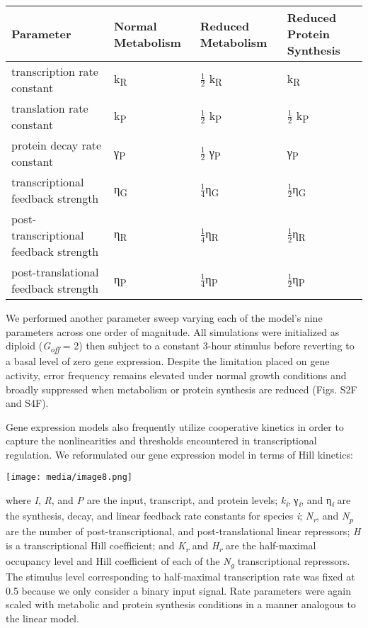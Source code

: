 \begin{longtable}[]{@{}llll@{}}
\toprule
\textbf{Parameter} & \textbf{Normal Metabolism} & \textbf{Reduced Metabolism} & \textbf{Reduced Protein Synthesis}\tabularnewline
\midrule
\endhead
transcription rate constant & k\textsubscript{R} & \(\frac{1}{2}\) k\textsubscript{R} & k\textsubscript{R}\tabularnewline
translation rate constant & k\textsubscript{P} & \(\frac{1}{2}\) k\textsubscript{P} & \(\frac{1}{2}\) k\textsubscript{P}\tabularnewline
protein decay rate constant & γ\textsubscript{P} & \(\frac{1}{2}\) γ\textsubscript{P} & γ\textsubscript{P}\tabularnewline
transcriptional feedback strength & η\textsubscript{G} & \(\frac{1}{4}\)η\textsubscript{G} & \(\frac{1}{2}\)η\textsubscript{G}\tabularnewline
post-transcriptional feedback strength & η\textsubscript{R} & \(\frac{1}{4}\)η\textsubscript{R} & \(\frac{1}{2}\)η\textsubscript{R}\tabularnewline
post-translational feedback strength & η\textsubscript{P} & \(\frac{1}{4}\)η\textsubscript{P} & \(\frac{1}{2}\)η\textsubscript{P}\tabularnewline
\bottomrule
\end{longtable}

We performed another parameter sweep varying each of the model's nine parameters across one order of magnitude. All simulations were initialized as diploid (\emph{G\textsubscript{off}} = 2) then subject to a constant 3-hour stimulus before reverting to a basal level of zero gene expression. Despite the limitation placed on gene activity, error frequency remains elevated under normal growth conditions and broadly suppressed when metabolism or protein synthesis are reduced (Figs. S2F and S4F).

Gene expression models also frequently utilize cooperative kinetics in order to capture the nonlinearities and thresholds encountered in transcriptional regulation. We reformulated our gene expression model in terms of Hill kinetics:

\texttt{[image: media/image8.png]}

where \emph{I}, \emph{R}, and \emph{P} are the input, transcript, and protein levels; \emph{k\textsubscript{i}}, γ\emph{\textsubscript{i}}, and η\emph{\textsubscript{i}} are the synthesis, decay, and linear feedback rate constants for species \emph{i}; \emph{N\textsubscript{r}}, and \emph{N\textsubscript{p}} are the number of post-transcriptional, and post-translational linear repressors; \emph{H} is a transcriptional Hill coefficient; and \emph{K\textsubscript{r}} and \emph{H\textsubscript{r}} are the half-maximal occupancy level and Hill coefficient of each of the \emph{N\textsubscript{g}} transcriptional repressors. The stimulus level corresponding to half-maximal transcription rate was fixed at 0.5 because we only consider a binary input signal. Rate parameters were again scaled with metabolic and protein synthesis conditions in a manner analogous to the linear model.

